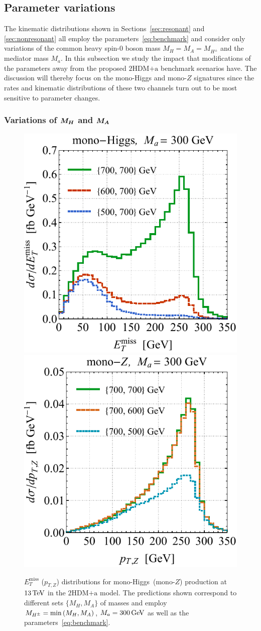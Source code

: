 \documentclass[a4paper, 11pt,notoc]{article}
\newcommand{\MET}{\ensuremath{E_T^\mathrm{miss}}\xspace}
\newcommand{\mA}{\ensuremath{M_{A}}\xspace}
\newcommand{\ma}{\ensuremath{M_{a}}\xspace}
\newcommand{\mH}{\ensuremath{M_{H}}\xspace}
\newcommand{\mHc}{\ensuremath{M_{H^{\pm}}}\xspace}
\newcommand{\hdma}{\ensuremath{\textrm{2HDM+a}}\xspace}
\def\bm#1{\mbox{\boldmath$#1$\unboldmath}}
\begin{document}
\subsection{Parameter variations}
\label{sec:parameter_variations}

The  kinematic distributions shown in Sections~\ref{sec:resonant} and \ref{sec:nonresonant}  all employ the parameters~\eqref{eq:benchmark} and consider only variations of the common heavy  spin-0 boson  mass $\mH = \mA = \mHc$ and the mediator mass $\ma$.  In this subsection we study the impact that modifications of the parameters away from the proposed \hdma benchmark scenarios have. The  discussion will thereby focus on the mono-Higgs and mono-$Z$ signatures since the rates and kinematic distributions of these two channels turn out to be  most sensitive to parameter changes. 

\subsubsection[Variations of $\mH$ and $\mA$]{Variations of $\bm{\mH}$ and $\bm{\mA}$}

\begin{figure}[t!]
\centering
\includegraphics[height=0.45\textwidth]{mvarl.pdf} \qquad 
\includegraphics[height=0.45\textwidth]{mvarr.pdf}
\vspace{2mm}
\caption{\label{fig:mvar} $\MET$ ($p_{T,Z}$) distributions for mono-Higgs~(mono-$Z$) production at $13 \, {\rm TeV}$ in the \hdma model.  The  predictions shown correspond to different sets $\{M_{H}, M_A\}$ of masses and employ $\mHc = {\rm min} \left ( \mH, \mA \right )$, $M_a = 300 \, {\rm GeV}$  as well as the parameters~\eqref{eq:benchmark}.}
\end{figure}
\end{document}
